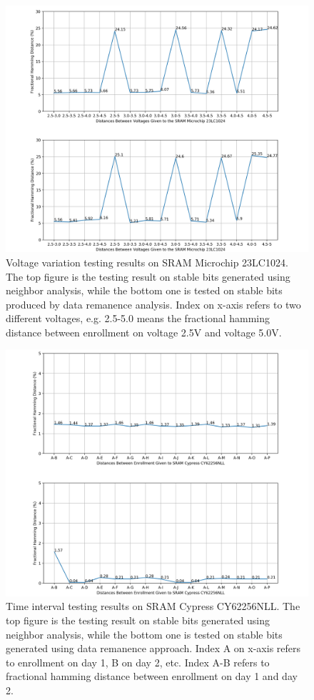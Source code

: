 \begin{figure}[tph!]
    \centerline{\includegraphics[width={1.1\textwidth}]{images/23lc1024_hd_intra_voltage_stable}}
    \caption{Voltage variation testing results on SRAM Microchip 23LC1024. The top figure is the testing result on stable bits generated using neighbor analysis, while the bottom one is tested on stable bits produced by data remanence analysis. Index on x-axis refers to two different voltages, e.g. 2.5-5.0 means the fractional hamming distance between enrollment on voltage 2.5V and voltage 5.0V.}
    \label{fig:test_stable_23lc1024_voltage}
\end{figure}

\begin{figure}[tph!]
    \centerline{\includegraphics[width={1.1\textwidth}]{images/cy62256nll_hd_intra_time_stable}}
    \caption{Time interval testing results on SRAM Cypress CY62256NLL. The top figure is the testing result on stable bits generated using neighbor analysis, while the bottom one is tested on stable bits generated using data remanence approach. Index A on x-axis refers to enrollment on day 1, B on day 2, etc. Index A-B refers to fractional hamming distance between enrollment on day 1 and day 2.}
    \label{fig:test_stable_cy62256nll}
\end{figure}

